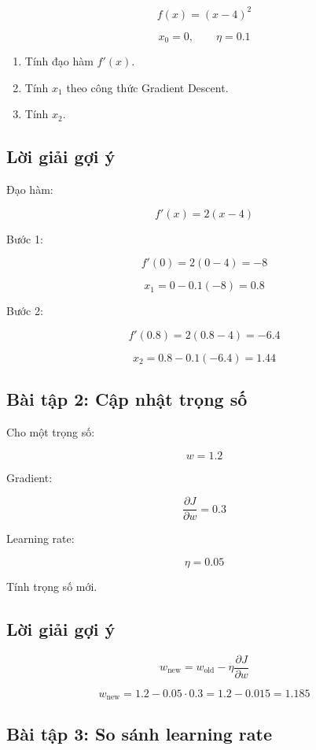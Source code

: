 \[
    f(x) = (x-4)^2
\]

\[
    x_0 = 0,\qquad \eta=0.1
\]

\begin{enumerate}
    \item Tính đạo hàm $f'(x)$.
    \item Tính $x_1$ theo công thức Gradient Descent.
    \item Tính $x_2$.
\end{enumerate}

\subsection*{Lời giải gợi ý}

Đạo hàm:

\[
    f'(x)=2(x-4)
\]

Bước 1:

\[
    f'(0)=2(0-4)=-8
\]

\[
    x_1=0-0.1(-8)=0.8
\]

Bước 2:

\[
    f'(0.8)=2(0.8-4)=-6.4
\]

\[
    x_2=0.8-0.1(-6.4)=1.44
\]

\subsection*{Bài tập 2: Cập nhật trọng số}

Cho một trọng số:

\[
    w=1.2
\]

Gradient:

\[
    \frac{\partial J}{\partial w}=0.3
\]

Learning rate:

\[
    \eta=0.05
\]

Tính trọng số mới.

\subsection*{Lời giải gợi ý}

\[
    w_{\text{new}}
    =
    w_{\text{old}}
    -
    \eta
    \frac{\partial J}{\partial w}
\]

\[
    w_{\text{new}}
    =
    1.2 - 0.05\cdot 0.3
    =
    1.2 - 0.015
    =
    1.185
\]

\subsection*{Bài tập 3: So sánh learning rate}

